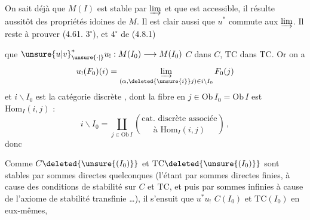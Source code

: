 \uline{} On sait déjà que $M(I)$ est stable par  $\varinjlim$  et que   est accessible,  il résulte aussitôt des propriétés idoines de $M$. Il est clair aussi que $u^*$ commute aux  $\varinjlim$. Il reste à prouver (4.61. $3^\circ$), et $4^\circ$ de (4.8.1) 

que $\unsure{u|v}_{\unsure{\cdot|{}}}^*u_!:M(I_0)\longrightarrow M(I_0)$   $C$ dans $C$, $\mathrm{TC}$ dans $\mathrm{TC}$. Or on a
\[
u_!(F_0)(i)=\varinjlim_{(\alpha,\deleted{\unsure{i}}j)\in i\backslash I_0}F_0(j)
\]
 et $i\backslash I_0$ est la catégorie discrète , dont la fibre en $j\in\mathrm{Ob}\,I_0=\mathrm{Ob}\,I$ est $\mathrm{Hom}_I(i,j)$ :
\[
i\backslash I_0=\coprod_{j\in\mathrm{Ob}\,I}\binom{\text{cat. discrète associée}}{\text{à }\mathrm{Hom}_I(i,j)}\,,
\]
donc

Comme $C\deleted{\unsure{(I_0)}}$ et $\mathrm{TC}\deleted{\unsure{(I_0)}}$ sont stables par sommes directes quelconques (l'étant par sommes directes finies, à cause des conditions de stabilité  sur $C$ et $\mathrm{TC}$, et puis par sommes infinies à cause de l'axiome 
de stabilité transfinie \ldots), il s'ensuit  que $u^*u_!$   $C(I_0)$ et $\mathrm{TC}(I_0)$ en eux-mêmes,

